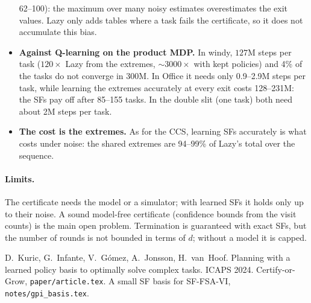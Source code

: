 \documentclass[11pt]{article}
\begin{document}
\begin{itemize}
62--100): the maximum over many noisy estimates overestimates the exit values. Lazy only adds tables where a task fails
the certificate, so it does not accumulate this bias.
\item \textbf{Against Q-learning on the product MDP.} In windy, $127$M steps per task ($120\times$ Lazy from the
extremes, $\sim3000\times$ with kept policies) and 4\% of the tasks do not converge in 300M. In Office it needs only
0.9--2.9M steps per task, while learning the extremes accurately at every exit costs 128--231M: the SFs pay off after
85--155 tasks. In the double slit (one task) both need about 2M steps per task.
\item \textbf{The cost is the extremes.} As for the CCS, learning SFs accurately is what costs under noise: the shared
extremes are 94--99\% of Lazy's total over the sequence.
\end{itemize}

\paragraph{Limits.} The certificate needs the model or a simulator; with learned SFs it holds only up to their noise.
A sound model-free certificate (confidence bounds from the visit counts) is the main open problem. Termination is
guaranteed with exact SFs, but the number of rounds is not bounded in terms of $d$; without a model it is capped.

{\small
\begin{thebibliography}{9}\setlength\itemsep{0pt}
 D.~Kuric, G.~Infante, V.~G\'omez, A.~Jonsson, H.~van~Hoof. Planning with a learned policy basis to
optimally solve complex tasks. ICAPS 2024.
 Certify-or-Grow, \texttt{paper/article.tex}.
 A small SF basis for SF-FSA-VI, \texttt{notes/gpi\_basis.tex}.
\end{thebibliography}}
\end{document}
